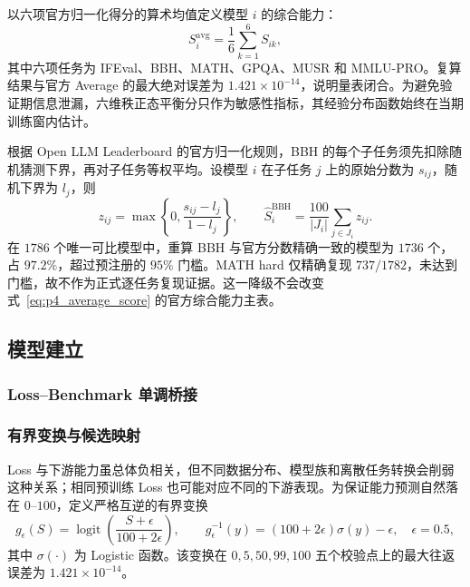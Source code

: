 以六项官方归一化得分的算术均值定义模型 $i$ 的综合能力：
\begin{equation}
S_i^{\mathrm{avg}}=\frac{1}{6}\sum_{k=1}^{6}S_{ik},
\label{eq:p4_average_score}
\end{equation}
其中六项任务为 IFEval、BBH、MATH、GPQA、MUSR 和 MMLU-PRO。复算结果与官方 Average 的最大绝对误差为 $1.421\times10^{-14}$，说明量表闭合。为避免验证期信息泄漏，六维秩正态平衡分只作为敏感性指标，其经验分布函数始终在当期训练窗内估计。

根据 Open LLM Leaderboard 的官方归一化规则\cite{huggingface2024normalization}，BBH 的每个子任务须先扣除随机猜测下界，再对子任务等权平均。设模型 $i$ 在子任务 $j$ 上的原始分数为 $s_{ij}$，随机下界为 $l_j$，则
\begin{equation}
z_{ij}=\max\left\{0,\frac{s_{ij}-l_j}{1-l_j}\right\},\qquad
\widehat S_i^{\mathrm{BBH}}=\frac{100}{|J_i|}\sum_{j\in J_i}z_{ij}.
\label{eq:p4_bbh}
\end{equation}
在 $1786$ 个唯一可比模型中，重算 BBH 与官方分数精确一致的模型为 $1736$ 个，占 $97.2\%$，超过预注册的 $95\%$ 门槛。MATH hard 仅精确复现 $737/1782$，未达到门槛，故不作为正式逐任务复现证据。这一降级不会改变式~\eqref{eq:p4_average_score} 的官方综合能力主表。

\subsection{模型建立}

\subsubsection{Loss--Benchmark 单调桥接}

\subsubsection{有界变换与候选映射}

Loss 与下游能力虽总体负相关，但不同数据分布、模型族和离散任务转换会削弱这种关系；相同预训练 Loss 也可能对应不同的下游表现\cite{gadre2025scalereliably,liu2023samepretraining,schaeffer2025predicting,mayilvahanan2025line}。为保证能力预测自然落在 $0$--$100$，定义严格互逆的有界变换
\begin{equation}
g_{\epsilon}(S)=\operatorname{logit}\left(\frac{S+\epsilon}{100+2\epsilon}\right),\qquad
g_{\epsilon}^{-1}(y)=(100+2\epsilon)\sigma(y)-\epsilon,
\quad \epsilon=0.5,
\label{eq:p4_link}
\end{equation}
其中 $\sigma(\cdot)$ 为 Logistic 函数。该变换在 $0,5,50,99,100$ 五个校验点上的最大往返误差为 $1.421\times10^{-14}$。

